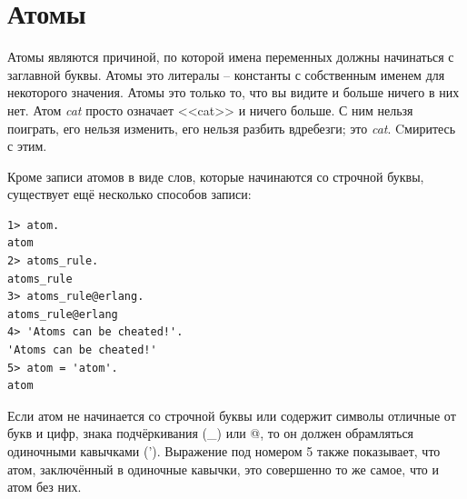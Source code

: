 \documentclass[a4paper,12pt]{report}
\begin{document}
\section{Атомы}
\label{atoms}
Атомы являются причиной, по которой имена переменных должны начинаться с заглавной буквы. Атомы это литералы \--- константы с собственным именем для некоторого значения. Атомы это только то, что вы видите и больше ничего в них нет. Атом \emph{cat} просто означает <<cat>> и ничего больше. С ним нельзя поиграть, его нельзя изменить, его нельзя разбить вдребезги; это \emph{cat}. Cмиритесь с этим.

Кроме записи атомов в виде слов, которые начинаются со строчной буквы, существует ещё несколько способов записи:
\begin{lstlisting}[style=repl]
1> atom.
atom
2> atoms_rule.
atoms_rule
3> atoms_rule@erlang.
atoms_rule@erlang
4> 'Atoms can be cheated!'.
'Atoms can be cheated!'
5> atom = 'atom'.
atom
\end{lstlisting}

Если атом не начинается со строчной буквы или содержит символы отличные от букв и цифр, знака подчёркивания (\_) или @, то он должен обрамляться одиночными кавычками ('). Выражение под номером 5 также показывает, что атом, заключённый в одиночные кавычки, это совершенно то же самое, что и атом без них.
\end{document}
